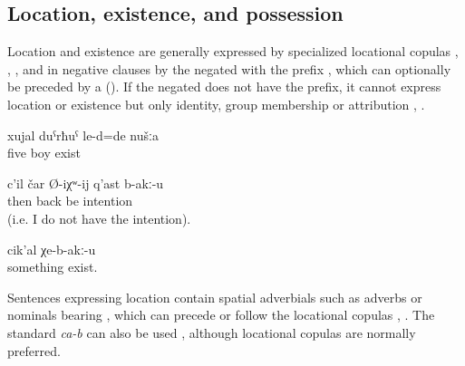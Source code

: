 
\subsection{Location, existence, and possession}
\label{ssec:Location, existence, and possession}

Location and existence are generally expressed by specialized locational copulas , , , and in negative clauses by the negated  with the  prefix , which can optionally be preceded by a   (). If the negated  does not have the  prefix, it cannot express location or existence but only identity, group membership or attribution , . 
%
\begin{exe}
	\ex	\label{ex:We were five guys}
	\gll	xujal	duˁrħuˁ	le-d=de	nušːa\\
		five	boy	exist	\\
	\glt	{}
	

	\ex	\label{ex:There is no intention to go back}
	\gll	c'il	čar	Ø-iχʷ-ij	q'ast	b-akː-u\\
		then	back	be	intention	\\
	\glt	{} (i.e. I do not have the intention).

	\ex	\label{ex:There is nothing more}
	\gll	cik'al	χe-b-akː-u\\
		something	exist.\\
	\glt	{}

\end{exe}

Sentences expressing location contain spatial adverbials such as adverbs or nominals bearing , which can precede or follow the locational copulas , . The standard  \textit{ca-b} can also be used , although locational copulas are normally preferred. 

